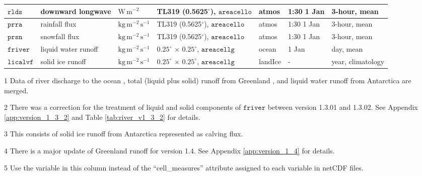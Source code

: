 \documentclass[dvipdfmx]{elsarticle_mod}
\begin{document}
\begin{table}[h]
\begin{threeparttable}
\begin{tabular*}{17.5cm}{p{1.4cm}|p{3.3cm}|p{1.6cm}|p{2.5cm}|p{1.4cm}|p{1.5cm}|p{2.8cm}}
$\texttt{rlds}$ &  downward longwave      & $\mathrm{W}\,\mathrm{m}^{-2}$ & TL319 (0.5625$^{\circ}$), $\texttt{areacello}$ & atmos & 1:30 1 Jan & 3-hour, mean \\ \hline
$\texttt{prra}$ & rainfall flux   & $\mathrm{kg}\,\mathrm{m}^{-2}\,\mathrm{s}^{-1}$  & TL319 (0.5625$^{\circ}$), $\texttt{areacello}$ & atmos & 1:30 1 Jan & 3-hour, mean \\ \hline
$\texttt{prsn}$ & snowfall flux   & $\mathrm{kg}\,\mathrm{m}^{-2}\,\mathrm{s}^{-1}$  & TL319 (0.5625$^{\circ}$), $\texttt{areacello}$ & atmos & 1:30 1 Jan & 3-hour, mean \\ \hline \hline
$\texttt{friver}$ & liquid water runoff\tnote{1,2,4} & $\mathrm{kg}\,\mathrm{m}^{-2}\,\mathrm{s}^{-1}$ & $0.25^{\circ}\,\times\,0.25^{\circ}$, $\texttt{areacellg}$ & ocean & 1 Jan & day, mean \\ \hline
$\texttt{licalvf}$ & solid ice runoff\tnote{3,4}  & $\mathrm{kg}\,\mathrm{m}^{-2}\,\mathrm{s}^{-1}$ & $0.25^{\circ}\,\times\,0.25^{\circ}$, $\texttt{areacellg}$ & landIce & - & year, climatology \\ \hline
\end{tabular*}
\begin{tablenotes}
 \item[1]{Data of river discharge to the ocean \citep{Suzuki_et_al_2018}, total (liquid plus solid) runoff from Greenland \citet{Bamber_et_al_2012}, and liquid water runoff from Antarctica \citep{Depoorter_et_al_2013} are merged.}
 \item[2]{There was a correction for the treatment of liquid and solid components of $\mathtt{friver}$ between version 1.3.01 and 1.3.02. See Appendix \ref{app:version_1_3_2} and Table \ref{tab:river_v1_3_2} for details.}
 \item[3]{This consists of solid ice runoff from Antarctica \citep{Depoorter_et_al_2013} represented as calving flux.}
 \item[4]{There is a major update of Greenland runoff for version 1.4. See Appendix \ref{app:version_1_4} for details.}
 \item[5]{Use the variable in this column instead of the ``cell\_measures'' attribute assigned to each variable in netCDF files.}
\end{tablenotes}
\end{threeparttable}
\end{table}
\end{document}
